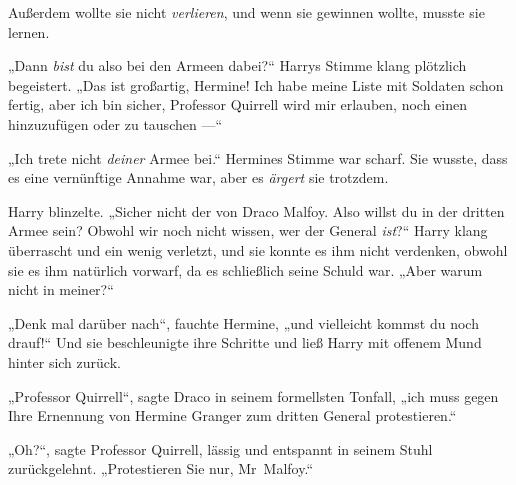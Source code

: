 Außerdem wollte sie nicht \emph{verlieren}, und wenn sie gewinnen wollte, musste sie lernen.

„Dann \emph{bist} du also bei den Armeen dabei?“ Harrys Stimme klang plötzlich begeistert.
„Das ist großartig, Hermine! Ich habe meine Liste mit Soldaten schon fertig, aber ich bin sicher, Professor Quirrell wird mir erlauben, noch einen hinzuzufügen oder zu tauschen —“

„Ich trete nicht \emph{deiner} Armee bei.“ Hermines Stimme war scharf. Sie wusste, dass es eine vernünftige Annahme war, aber es \emph{ärgert} sie trotzdem.

Harry blinzelte.
„Sicher nicht der von Draco Malfoy. Also willst du in der dritten Armee sein? Obwohl wir noch nicht wissen, wer der General \emph{ist}?“ Harry klang überrascht und ein wenig verletzt, und sie konnte es ihm nicht verdenken, obwohl sie es ihm natürlich vorwarf, da es schließlich seine Schuld war.
„Aber warum nicht in meiner?“

„Denk mal darüber nach“, fauchte Hermine, „und vielleicht kommst du noch drauf!“
Und sie beschleunigte ihre Schritte und ließ Harry mit offenem Mund hinter sich zurück.

\later

„Professor Quirrell“, sagte Draco in seinem formellsten Tonfall, „ich muss gegen Ihre Ernennung von Hermine Granger zum dritten General protestieren.“

„Oh?“, sagte Professor Quirrell, lässig und entspannt in seinem Stuhl zurückgelehnt.
„Protestieren Sie nur, Mr~Malfoy.“

